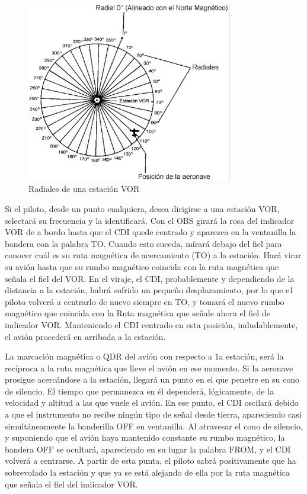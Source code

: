 \begin{figure}[htb]
  \centering
\includegraphics[keepaspectratio,width=0.8\textwidth]{06.radionavegacion/Imagenes/06.02.vor.imagenes/radiales-vor.eps}
  \caption{Radiales de una estación VOR}
  \label{fig:radiales-vor}
\end{figure}


Si el piloto, desde un punto cualquiera, desea dirigirse a una estación VOR, selectará su frecuencia y la identificará. Con el OBS girará la rosa del indicador VOR de a bordo hasta que el CDI quede centrado y aparezca en la ventanilla la bandera con la palabra TO. Cuando esto suceda, mírará debajo del fiel para conocer cuál es su ruta magnética de acercamiento (TO) a la estación. Hará virar su avión hasta que su rumbo magnético coincida con la ruta magnética que señala el fiel del VOR. En el viraje, el CDI, probablemente y dependiendo de la distancia a la estación, habrá sufrido un pequeño desplazamiento, por lo que e1 piloto volverá a centrarlo de nuevo siempre en TO, y tomará el nuevo rumbo magnético que coincida con la Ruta magnética que señale ahora el fiel de indicador VOR. Manteniendo el CDI centrado en esta posición, indudablemente, el avión procederá en arribada a la estación. 

La marcación magnética o QDR del avión con respecto a 1a estación, será la recíproca a la ruta magnética que lleve el avión en ese momento. Si la aeronave prosigue acercándose a la estación, llegará un punto en el que penetre en su cono de silencio. El tiempo que permanezca en él dependerá, lógicamente, de la velocidad y altitud a las que vuele el avión. En ese punto, el CDI oscilará debido a que el instrumento no recibe ningún tipo de señal desde tierra, apareciendo casi simultáneamente la banderilla OFF en ventanilla. Al atravesar el cono de silencio, y suponiendo que el avión haya mantenido constante su rumbo magnético, la bandera OFF se ocultará, apareciendo en su lugar la palabra FROM, y el CDI volverá a centrarse. A partir de esta punta, el piloto sabrá positivamente que ha sobrevolado la estación y que ya se está alejando de ella por la ruta magnética que señala el fiel del indicador VOR.

